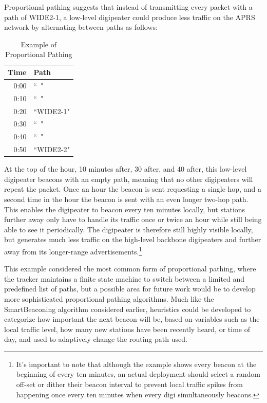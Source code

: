 Proportional pathing suggests that instead of transmitting every packet with
a path of WIDE2-1, a low-level digipeater could produce less traffic on the
APRS network by alternating between paths as follows:
\begin{table}[!h]
	\centering
	\begin{tabular}{ | r | l |}
		\hline
		Time & Path \\ \hline
		0:00 & ``~" \\ \hline
		0:10 & ``~" \\ \hline
		0:20 & ``WIDE2-1" \\ \hline
		0:30 & ``~" \\ \hline
		0:40 & ``~" \\ \hline
		0:50 & ``WIDE2-2" \\ \hline
	\end{tabular}
	\caption{Example of Proportional Pathing}
	\label{tab:exproppath}
\end{table}

At the top of the hour, 10 minutes after, 30 after, and 40 after, 
this low-level digipeater
beacons with an empty path, meaning that no other digipeaters will repeat the
packet.
Once an hour the beacon is sent requesting a single hop, and a second time
in the hour the beacon is sent with an even longer two-hop path.
This enables the digipeater to beacon every ten minutes locally,
but stations further away only have to handle its traffic once or twice an hour
while still being able to see it periodically.
The digipeater is therefore still highly visible locally, but generates
much less traffic on the high-level backbone digipeaters and further away from its
longer-range advertisements.\footnote{It's important
	to note that although the example shows every beacon at the beginning of
	every ten minutes, an actual deployment should select a random off-set
or dither their beacon interval to prevent local traffic spikes 
from happening once every ten minutes when every digi simultaneously beacons.}

This example considered the most common form of proportional pathing,
where the tracker maintains a finite state machine to switch between
a limited and predefined list of paths,
but a possible area for future work would be to develop more sophisticated
proportional pathing algorithms.
Much like the SmartBeaconing algorithm considered earlier,
heuristics could be developed to categorize how important the next beacon
will be, based on variables such as the local traffic level,
how many new stations have been recently heard, or time of day,
and used to adaptively change the routing path used.


